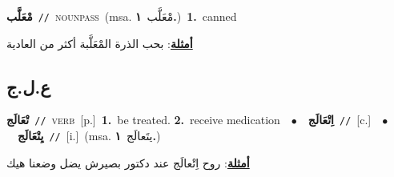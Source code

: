 \documentclass[10pt,a4paper,twoside]{article} %
\begin{document}
\begin{multicols}{2}
{\setlength\topsep{0pt}\textbf{\foreignlanguage{arabic}{مْعَلَّب}}\ {\color{gray}\texttt{//}\color{black}}\ \textsc{noun\textunderscore pass}\ \color{gray}(msa. \foreignlanguage{arabic}{مْعَلَّب}~\foreignlanguage{arabic}{\textbf{١.}})\color{black}\ \textbf{1.}~canned\  \begin{flushright}\color{gray}\foreignlanguage{arabic}{\textbf{\underline{\foreignlanguage{arabic}{أمثلة}}}: بحب الذرة المْعَلَّبة أكثر من العادية}\end{flushright}\color{black}} \vspace{2mm}

\vspace{-3mm}
\subsection*{\color{blue}\foreignlanguage{arabic}{ع.ل.ج}\color{blue}{}} 

{\setlength\topsep{0pt}\textbf{\foreignlanguage{arabic}{تْعَالَج}}\ {\color{gray}\texttt{//}\color{black}}\ \textsc{verb}\ [p.]\ \textbf{1.}~be treated.  \textbf{2.}~receive medication\ \ $\bullet$\ \ \setlength\topsep{0pt}\textbf{\foreignlanguage{arabic}{اِتْعَالَج}}\ {\color{gray}\texttt{//}\color{black}}\ [c.]\ \ $\bullet$\ \ \setlength\topsep{0pt}\textbf{\foreignlanguage{arabic}{يِتْعَالَج}}\ {\color{gray}\texttt{//}\color{black}}\ [i.]\ \color{gray}(msa. \foreignlanguage{arabic}{يتَعالَج}~\foreignlanguage{arabic}{\textbf{١.}})\color{black}\  \begin{flushright}\color{gray}\foreignlanguage{arabic}{\textbf{\underline{\foreignlanguage{arabic}{أمثلة}}}: روح اِتْعالَج عند دكتور بصيرش يضل وضعنا هيك}\end{flushright}\color{black}} \vspace{2mm}


\end{multicols}
\end{document}
